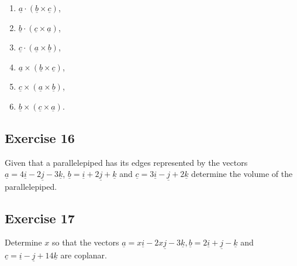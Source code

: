 \documentclass[
  11pt,
  oneside]{book}
\providecommand{\tightlist}{%
  \setlength{\itemsep}{0pt}\setlength{\parskip}{0pt}}
\newcommand{\slide}{}
\theoremstyle{definition}
\theoremstyle{definition}
\theoremstyle{definition}
\theoremstyle{definition}
\theoremstyle{remark}
\begin{document}
\begin{enumerate}
\def\labelenumi{\roman{enumi}.}
\tightlist
\item
  \(\underline{a} \cdot (\underline{b} \times \underline{c})\),
\item
  \(\underline{b} \cdot (\underline{c} \times \underline{a})\),
\item
  \(\underline{c} \cdot (\underline{a} \times \underline{b})\),
\item
  \(\underline{a} \times (\underline{b} \times \underline{c})\),
\item
  \(\underline{c} \times (\underline{a} \times \underline{b})\),
\item
  \(\underline{b} \times (\underline{c} \times \underline{a})\).
\end{enumerate}

\slide

\subsection*{Exercise 16}\label{exercise-16}

Given that a parallelepiped has its edges represented by the vectors \(\underline{a} = 4\underline{i} - 2\underline{j} - 3\underline{k}\), \(\underline{b} = \underline{i} + 2\underline{j} + \underline{k}\) and \(\underline{c} = 3\underline{i} - \underline{j} + 2\underline{k}\) determine the volume of the parallelepiped.

\slide

\subsection*{Exercise 17}\label{exercise-17}

Determine \(x\) so that the vectors \(\underline{a} = x\underline{i} - 2x\underline{j} - 3\underline{k}, \underline{b} =2 \underline{i} + \underline{j} - \underline{k}\) and \(\underline{c} = \underline{i} - \underline{j} + 14\underline{k}\) are coplanar.
\end{document}
